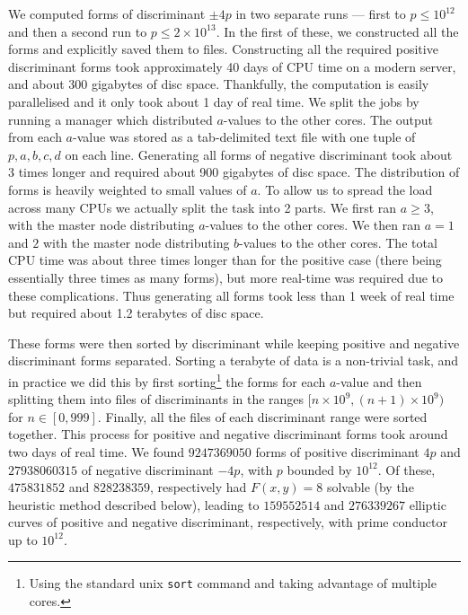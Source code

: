 We computed forms of discriminant $\pm 4p$ in two separate runs --- first to $p\leq 10^{12}$ and then a second run to $p 
\leq 2\times 10^{13}$. In the first of these, we constructed all the forms and explicitly saved them to files. 
Constructing all the required positive discriminant forms took approximately 40 days of CPU time on a modern server, and 
about 300 gigabytes of disc space. Thankfully, the computation is easily parallelised and it only took about 1 day of 
real time. We split the jobs by running a manager which distributed $a$-values to the other cores. The output from each 
$a$-value was stored as a tab-delimited text file with one tuple of $p,a,b,c,d$ on each line. Generating all forms of 
negative discriminant took about 3 times longer and required about 900 gigabytes of disc space. The distribution of 
forms is heavily weighted to small values of $a$. To allow us to spread the load across many CPUs we actually split the 
task into 2 parts. We first ran $a \geq 3$, with the master node distributing $a$-values to the other cores. We then ran 
$a=1$ and $2$ with the master node distributing $b$-values to the other cores. The total CPU time was about three times longer 
than for the positive case (there being essentially three times as many forms), but more real-time was required due to 
these complications. Thus generating all forms took less than 1 week of real time but required about 1.2 terabytes of 
disc space. 

These forms were then sorted by discriminant while keeping positive and negative discriminant forms separated. Sorting 
a terabyte of data is a non-trivial task, and in practice we did this by first sorting\footnote{Using the standard unix 
\texttt{sort} command and taking advantage of multiple cores.} the forms for each $a$-value and then splitting them into 
files of discriminants in the ranges $[n \times 10^9, (n+1)\times 10^9)$ for $n\in[0,999]$. Finally, all the files of 
each discriminant range were sorted together. This process for positive and negative discriminant forms took around two days of real 
time. We found $9247369050$ forms of positive discriminant $4p$  and  $27938060315$ of negative discriminant $-4p$, with $p$
bounded by $10^{12}$. Of these, $475831852$ and $828238359$, respectively had $F(x,y)=8$ solvable (by the 
heuristic method described below), leading to $159552514$ and $276339267$ elliptic curves of positive and negative 
discriminant, respectively, with prime conductor up to $10^{12}$.

